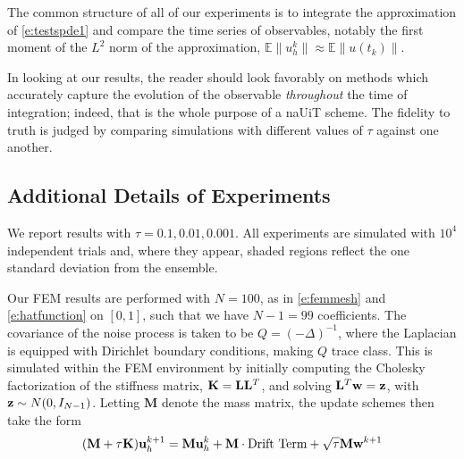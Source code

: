 \documentclass[reqno, 11pt]{amsart}
\newcommand{\gsnote}[1]{\textcolor{Cerulean}{#1}}
\theoremstyle{plain}
\theoremstyle{definition}
\theoremstyle{remark}
\numberwithin{equation}{section}
\numberwithin{theorem}{section}
\newcommand{\E}{\mathbb{E}}
\begin{document}
{The common structure of all of our experiments is to integrate the approximation of \eqref{e:testspde1} and compare the time series of observables, notably the first  moment of the $L^2$ norm of the approximation, $\E\|u_h^k\|\approx \E\|u(t_k)\|$. 


In looking at our results, the reader should look favorably on methods which accurately capture the evolution of the observable {\it throughout} the time of integration; indeed, that is the whole purpose of a naUiT scheme.  The fidelity to truth is judged by comparing simulations with different values of $\tau$ against one another.  

\subsection{Additional Details of Experiments}
We report results with $\tau = 0.1, 0.01, 0.001$.  All experiments are simulated with $10^4$ independent trials and, where they appear, shaded regions reflect the one standard deviation from the ensemble.






Our FEM results are performed with $N=100$, as in \eqref{e:femmesh} and \eqref{e:hatfunction} on $[0,1]$, such that we have $N-1=99$ coefficients.  The covariance of the noise process is taken to be  $Q = (-\Delta)^{-1}$, where the Laplacian is equipped with Dirichlet boundary conditions, making $Q$ trace class.  This is simulated within the FEM environment by initially computing the Cholesky factorization of the stiffness matrix, ${\bf K} = {\bf L}{\bf L}^T$, and solving $\mathbf{L}^T {\mathbf{w}} = {\bf z}$, with ${\bf z} \sim N(0,I_{N-1})$.  Letting $\mathbf{M}$ denote the mass matrix, the update schemes then take the form
\begin{equation*}
({\bf M} + \tau {\bf K}){\bf u}_h^{k+1} = {\bf M} {\bf u}_h^{k} + {\bf M} \cdot  \text{Drift Term} +\sqrt{\tau} {\bf M} {\bf w}^{k+1}
\end{equation*}

}
\end{document}
